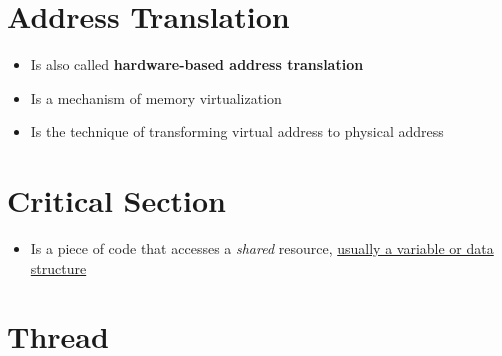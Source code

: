 \documentclass[12pt]{article}
\begin{document}
\section{Address Translation}

\begin{itemize}
    \item Is also called \textbf{hardware-based address translation}
    \item Is a mechanism of memory virtualization
    \item Is the technique of transforming virtual address to physical address
\end{itemize}

\pagebreak

\section{Critical Section}

\begin{itemize}
    \item Is a piece of code that accesses a \textit{shared} resource,
    \ul{usually a variable or data structure}
\end{itemize}

\section{Thread}
\end{document}
